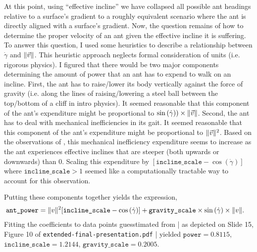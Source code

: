 \documentclass{article}
\DeclarePairedDelimiter\norm{\lVert}{\rVert}%
\begin{document}
At this point, using ``effective incline'' we have collapsed all possible ant headings relative to a surface's gradient to a roughly equivalent scenario where the ant is directly aligned with a surface's gradient.
Now, the question remains of how to determine the proper velocity of an ant given the effective incline it is suffering.
To answer this question, I used some heuristics to describe a relationship between $\dot{\gamma}$ and $\norm{\vec{v}}$.
This heuristic approach neglects formal consideration of units (i.e. rigorous physics).
I figured that there would be two major components determining the amount of power that an ant has to expend to walk on an incline.
First, the ant has to raise/lower its body vertically against the force of gravity (i.e. along the lines of raising/lowering a steel ball between the top/bottom of a cliff in intro physics).
It seemed reasonable that this component of the ant's expenditure might be proportional to $\sin{(\dot{\gamma})}) \times \norm{\vec{v}}$.
Second, the ant has to deal with mechanical inefficiencies in its gait.
It seemed reasonable that this component of the ant's expenditure might be proportional to $\norm{\vec{v}}^2$.
Based on the observations of \cite{Holt2012LocomotionTerrain}, this mechanical inefficiency expenditure seems to increase as the ant experiences effective inclines that are steeper (both upwards or downwards) than 0.
Scaling this expenditure by $[\texttt{incline\_scale} - \cos{(\dot{\gamma})}]$ where $\texttt{incline\_scale} > 1$ seemed like a computationally tractable way to account for this observation.

Putting these components together yields the expression,
\begin{align} \label{eqn:powerrelationship}
\texttt{ant\_power} 
&= \norm{v}^2[\texttt{incline\_scale} - \cos{(\dot{\gamma})}] + \texttt{gravity\_scale} \times \sin{(\dot{\gamma})} \times \norm{v}.
\end{align}
Fitting the coefficients to data points guesstimated from \cite{Holt2012LocomotionTerrain} | as depicted on 
Slide 15, Figure 10 of \texttt{extended-final-presentation.pdf} | yielded $\texttt{power} = 0.8115$, $\texttt{incline\_scale} = 1.2144$, $\texttt{gravity\_scale} = 0.2005$.
\end{document}
